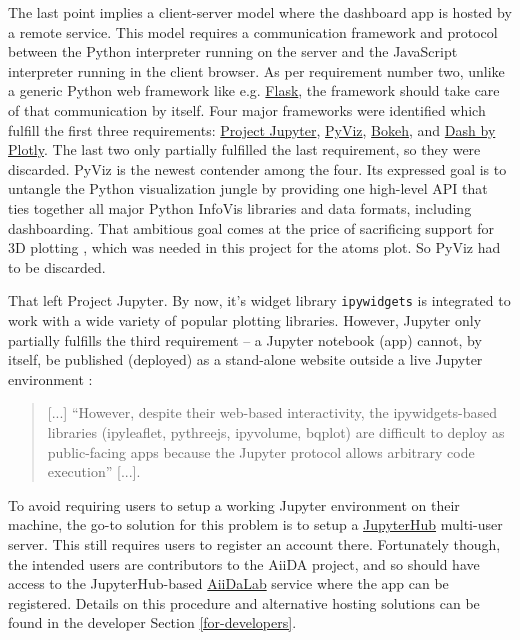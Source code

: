 The last point implies a client-server model where the dashboard app is hosted
by a remote service. This model requires a communication framework and protocol
between the Python interpreter running on the server and the JavaScript
interpreter running in the client browser. As per requirement number two, unlike
a generic Python web framework like e.g. \href{http://flask.pocoo.org/}{Flask},
the framework should take care of that communication by itself. Four major
frameworks were identified which fulfill the first three requirements:
\href{https://jupyter.org/}{Project Jupyter}, \href{http://pyviz.org/}{PyViz},
\href{https://bokeh.pydata.org/en/latest/}{Bokeh}, and
\href{https://plot.ly/products/dash/}{Dash by Plotly}. The last two only
partially fulfilled the last requirement, so they were discarded. PyViz is the
newest contender among the four. Its expressed goal is to untangle the Python
visualization jungle by providing one high-level API that ties together all
major Python InfoVis libraries and data formats, including dashboarding. That
ambitious goal comes at the price of sacrificing support for 3D plotting
\cite{pyviz-faq}, which was needed in this project for the atoms plot. So PyViz
had to be discarded.

That left Project Jupyter. By now, it's widget library \texttt{ipywidgets} is
integrated to work with a wide variety of popular plotting libraries. However,
Jupyter only partially fulfills the third requirement -- a Jupyter notebook
(app) cannot, by itself, be published (deployed) as a stand-alone website
outside a live Jupyter environment \cite{python-viz-2018}:

\begin{quote}
    [...] ``However, despite their web-based interactivity, the ipywidgets-based
    libraries (ipyleaflet, pythreejs, ipyvolume, bqplot) are difficult to deploy
    as public-facing apps because the Jupyter protocol allows arbitrary code
    execution'' [...].
\end{quote}

To avoid requiring users to setup a working Jupyter environment on their
machine, the go-to solution for this problem is to setup a
\href{https://jupyter.org/hub}{JupyterHub} multi-user server. This still
requires users to register an account there. Fortunately though, the intended
users are contributors to the AiiDA project, and so should have access to the
JupyterHub-based \href{ https://aiidalab.materialscloud.org/}{AiiDaLab} service
where the app can be registered. Details on this procedure and alternative
hosting solutions can be found in the developer Section
\vref{for-developers}.



